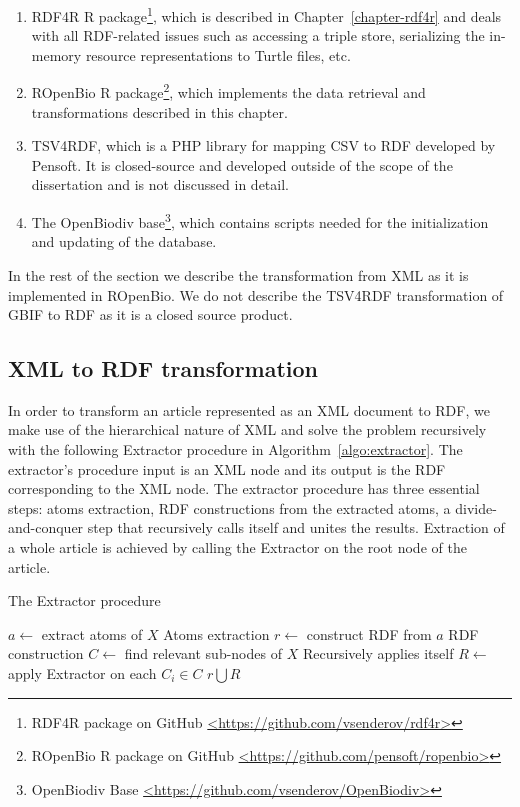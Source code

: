 \begin{enumerate}
\item{RDF4R R package\footnote{RDF4R package on GitHub \href{https://github.com/vsenderov/rdf4r}{\url{<https://github.com/vsenderov/rdf4r>}}}, which is described in Chapter~\ref{chapter-rdf4r} and deals with all RDF-related issues such as accessing a triple store, serializing the in-memory resource representations to Turtle files, etc.}
\item{ROpenBio R package\footnote{ROpenBio R package on GitHub \href{https://github.com/pensoft/ropenbio}{\url{<https://github.com/pensoft/ropenbio>}}}, which implements the data retrieval and transformations described in this chapter.}
\item{TSV4RDF, which is a PHP library for mapping CSV to RDF developed by Pensoft. It is closed-source and developed outside of the scope of the dissertation and is not discussed in detail.}
\item{The OpenBiodiv base\footnote{OpenBiodiv Base \href{https://github.com/vsenderov/OpenBiodiv}{\url{<https://github.com/vsenderov/OpenBiodiv>}}}, which contains scripts needed for the initialization and updating of the database.}
\end{enumerate}

In the rest of the section we describe the transformation from XML as it is implemented in ROpenBio. We do not describe the TSV4RDF transformation of GBIF to RDF as it is a closed source product.

\subsection{XML to RDF transformation}

In order to transform an article represented as an XML document to RDF, we make use of the hierarchical nature of XML and solve the problem recursively with the following Extractor procedure in Algorithm~\ref{algo:extractor}. The extractor's procedure input is an XML node and its output is the RDF corresponding to the XML node. The extractor procedure has three essential steps: atoms extraction, RDF constructions from the extracted atoms, a divide-and-conquer step that recursively calls itself and unites the results. Extraction of a whole article is achieved by calling the Extractor on the root node of the article.

\begin{algorithm}
\caption{The Extractor procedure}
\begin{algorithmic}[1]
\State $a \leftarrow$ extract atoms of $X$
\Comment Atoms extraction
\State $r \leftarrow$ construct RDF from $a$
\Comment RDF construction
\State $C \leftarrow$ find relevant sub-nodes of $X$
\Comment Recursively applies itself
\State $R \leftarrow$ apply Extractor on each $C_i \in C$
\State \Return $r \bigcup R$
\EndProcedure
\end{algorithmic}
\label{algo:extractor}
\end{algorithm}

